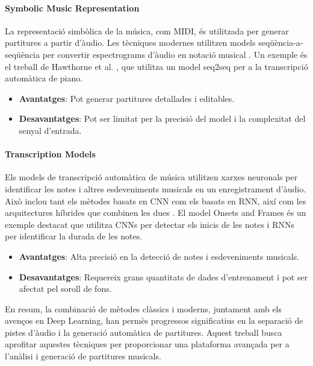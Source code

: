 \documentclass[10pt,a4paper,twocolumn,twoside]{article}
\begin{document}
\paragraph{Symbolic Music Representation}
La representació simbòlica de la música, com MIDI, és utilitzada per generar partitures a partir d'àudio. Les tècniques modernes utilitzen models seqüència-a-seqüència per convertir espectrograms d'àudio en notació musical \cite{zeng2021musicbert}. Un exemple és el treball de Hawthorne et al. \cite{hawthorne2018enabling}, que utilitza un model seq2seq per a la transcripció automàtica de piano.

\begin{itemize}
    \item \textbf{Avantatges}: Pot generar partitures detallades i editables.
    \item \textbf{Desavantatges}: Pot ser limitat per la precisió del model i la complexitat del senyal d'entrada.
\end{itemize}

\paragraph{Transcription Models}
Els models de transcripció automàtica de música utilitzen xarxes neuronals per identificar les notes i altres esdeveniments musicals en un enregistrament d'àudio. Això inclou tant els mètodes basats en CNN com els basats en RNN, així com les arquitectures híbrides que combinen les dues \cite{sturm2016music}. El model Onsets and Frames \cite{hawthorne2017onsets} és un exemple destacat que utilitza CNNs per detectar els inicis de les notes i RNNs per identificar la durada de les notes.

\begin{itemize}
    \item \textbf{Avantatges}: Alta precisió en la detecció de notes i esdeveniments musicals.
    \item \textbf{Desavantatges}: Requereix grans quantitats de dades d'entrenament i pot ser afectat pel soroll de fons.
\end{itemize}

En resum, la combinació de mètodes clàssics i moderns, juntament amb els avenços en Deep Learning, han permès progressos significatius en la separació de pistes d'àudio i la generació automàtica de partitures. Aquest treball busca aprofitar aquestes tècniques per proporcionar una plataforma avançada per a l'anàlisi i generació de partitures musicals.
\end{document}
